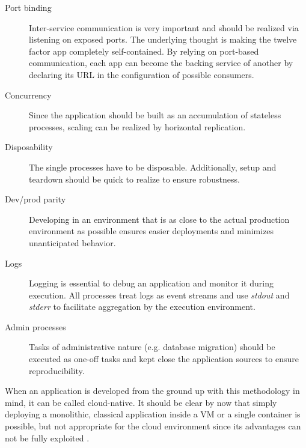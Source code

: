 \begin{description}
	\item[Port binding] Inter-service communication is very important and should be realized via listening on exposed ports. The underlying thought is making the twelve factor app completely self-contained. By relying on port-based communication, each app can become the backing service of another by declaring its URL in the configuration of possible consumers. 
	\item[Concurrency] Since the application should be built as an accumulation of stateless processes, scaling can be realized by horizontal replication.
	\item[Disposability] The single processes have to be disposable. Additionally, setup and teardown should be quick to realize to ensure robustness. 
	\item[Dev/prod parity] Developing in an environment that is as close to the actual production environment as possible ensures easier deployments and minimizes unanticipated behavior.
	\item[Logs] Logging is essential to debug an application and monitor it during execution. All processes treat logs as event streams and use \textit{stdout} and \textit{stderr} to facilitate aggregation by the execution environment. 
	\item[Admin processes] Tasks of administrative nature (e.g. database migration) should be executed as one-off tasks and kept close the application sources to ensure reproducibility.
\end{description}
\newpage
When an application is developed from the ground up with this methodology in mind, it can be called cloud-native. It should be clear by now that simply deploying a monolithic, classical application inside a VM or a single container is possible, but not appropriate for the cloud environment since its advantages can not be fully exploited \cite{hofmann2017microservices} \cite{12Factor}.

